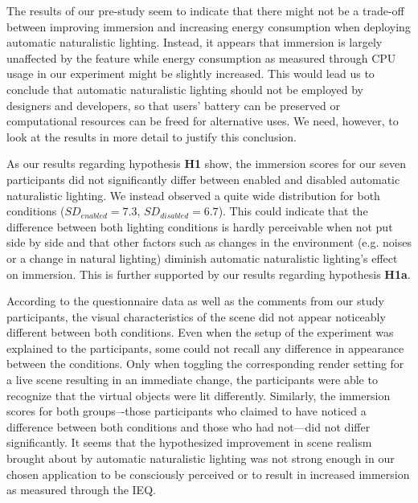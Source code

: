 \documentclass[12pt,twoside,english]{article}
\begin{document}
The results of our pre-study seem to indicate that there might not be a trade-off between improving immersion and increasing energy consumption when deploying automatic naturalistic lighting.
Instead, it appears that immersion is largely unaffected by the feature while energy consumption as measured through \gls{CPU} usage in our experiment might be slightly increased.
This would lead us to conclude that automatic naturalistic lighting should not be employed by designers and developers, so that users' battery can be preserved or computational resources can be freed for alternative uses.
We need, however, to look at the results in more detail to justify this conclusion.

As our results regarding hypothesis \textbf{H1} show, the immersion scores for our seven participants did not significantly differ between enabled and disabled automatic naturalistic lighting.
We instead observed a quite wide distribution for both conditions ($ SD_{enabled} = 7.3 $, $ SD_{disabled} = 6.7 $).
This could indicate that the difference between both lighting conditions is hardly perceivable when not put side by side and that other factors such as changes in the environment (e.g. noises or a change in natural lighting) diminish automatic naturalistic lighting's effect on immersion.
This is further supported by our results regarding hypothesis \textbf{H1a}.

According to the questionnaire data as well as the comments from our study participants, the visual characteristics of the scene did not appear noticeably different between both conditions.
Even when the setup of the experiment was explained to the participants, some could not recall any difference in appearance between the conditions.
Only when toggling the corresponding render setting for a live scene resulting in an immediate change, the participants were able to recognize that the virtual objects were lit differently.
Similarly, the immersion scores for both groups–-those participants who claimed to have noticed a difference between both conditions and those who had not---did not differ significantly.
It seems that the hypothesized improvement in scene realism brought about by automatic naturalistic lighting was not strong enough in our chosen application to be consciously perceived or to result in increased immersion as measured through the \gls{IEQ}.
\end{document}
